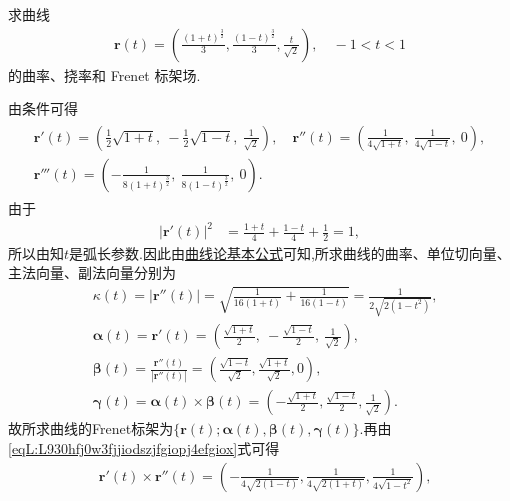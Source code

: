 \documentclass[../../main.tex]{subfiles}%
\begin{document}
\begin{example}
求曲线
\begin{align*}
\bm{r}(t) = \left( \frac{(1+t)^{\frac{3}{2}}}{3}, \frac{(1-t)^{\frac{3}{2}}}{3}, \frac{t}{\sqrt{2}} \right),\quad -1 < t < 1
\end{align*}
的曲率、挠率和 Frenet 标架场.
\end{example}
\begin{solution}

由条件可得
\begin{gather}\label{eqL:L930hfj0w3fjjiodszjfgiopj4efgiox}
\begin{gathered}
\bm{r}'(t) = \left( \frac{1}{2}\sqrt{1+t},\ -\frac{1}{2}\sqrt{1-t},\ \frac{1}{\sqrt{2}} \right), \quad
\bm{r}''(t) = \left( \frac{1}{4\sqrt{1+t}},\ \frac{1}{4\sqrt{1-t}},\ 0 \right), \\
\bm{r}'''(t) = \left( -\frac{1}{8(1+t)^{\frac{3}{2}}},\ \frac{1}{8(1-t)^{\frac{3}{2}}},\ 0 \right).
\end{gathered}
\end{gather}
由于
\begin{align*}
|\bm{r}'(t)|^2 &= \frac{1+t}{4}+\frac{1-t}{4}+\frac{1}{2}=1,
\end{align*}
所以由知$t$是弧长参数.因此由\hyperref[theorem:曲线论基本公式]{曲线论基本公式}可知,所求曲线的曲率、单位切向量、主法向量、副法向量分别为
\begin{align*}
&\kappa (t)=|\boldsymbol{r}'' (t)|=\sqrt{\frac{1}{16(1+t)}+\frac{1}{16(1-t)}}=\frac{1}{2\sqrt{2(1-t^2)}},
\\
&\bm{\alpha}(t) = \bm{r}'(t) = \left( \frac{\sqrt{1+t}}{2},\ -\frac{\sqrt{1-t}}{2},\ \frac{1}{\sqrt{2}} \right),
\\
&\boldsymbol{\beta }(t)=\frac{\boldsymbol{r}'' (t)}{|\boldsymbol{r}'' (t)|}=\left( \frac{\sqrt{1-t}}{\sqrt{2}}, \frac{\sqrt{1+t}}{\sqrt{2}}, 0 \right) ,
\\
&\boldsymbol{\gamma }\left( t \right) =\boldsymbol{\alpha }\left( t \right) \times \boldsymbol{\beta }\left( t \right) =\left( -\frac{\sqrt{1+t}}{2}, \frac{\sqrt{1-t}}{2}, \frac{1}{\sqrt{2}} \right) .
\end{align*}
故所求曲线的Frenet标架为$\{\bm{r}(t);\bm{\alpha}(t),\bm{\beta}(t),\bm{\gamma}(t)\}$.再由\eqref{eqL:L930hfj0w3fjjiodszjfgiopj4efgiox}式可得
\begin{align*}
&\boldsymbol{r}' \left( t \right) \times \boldsymbol{r}'' \left( t \right) =\left( -\frac{1}{4\sqrt{2\left( 1-t \right)}},\frac{1}{4\sqrt{2\left( 1+t \right)}},\frac{1}{4\sqrt{1-t^2}} \right) ,

\end{align*}
\end{solution}
\end{document}
